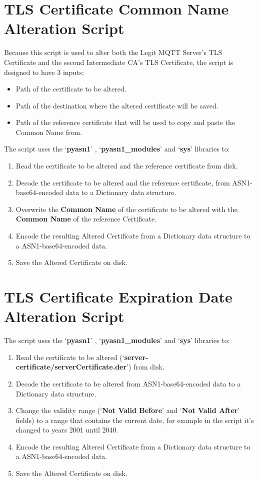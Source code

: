 \documentclass[binding=0.6cm,noexaminfo]{sapthesis}
\begin{document}
\section{TLS Certificate Common Name Alteration Script}

Because this script is used to alter both the Legit MQTT Server's TLS Certificate and the second Intermediate CA's TLS Certificate, the script is designed to have 3 inputs:
\begin{itemize}
	\item Path of the certificate to be altered.
	\item Path of the destination where the altered certificate will be saved.
	\item Path of the reference certificate that will be used to copy and paste the Common Name from.
\end{itemize}
The script uses the `\textbf{pyasn1}' , `\textbf{pyasn1\_modules}' and `\textbf{sys}' libraries to:
\begin{enumerate}
	\item Read the certificate to be altered and the reference certificate from disk.
	\item Decode the certificate to be altered and the reference certificate, from ASN1-base64-encoded data to a Dictionary data structure.
	\item Overwrite the \textbf{Common Name} of the certificate to be altered with the \textbf{Common Name} of the reference Certificate.
	\item Encode the resulting Altered Certificate from a Dictionary data structure to a ASN1-base64-encoded data.
	\item Save the Altered Certificate on disk.
\end{enumerate}

\section{TLS Certificate Expiration Date Alteration Script}

The script uses the `\textbf{pyasn1}' , `\textbf{pyasn1\_modules}' and `\textbf{sys}' libraries to:
\begin{enumerate}
	\item Read the certificate to be altered (`\textbf{server-certificate/serverCertificate.der}') from disk.
	\item Decode the certificate to be altered from ASN1-base64-encoded data to a Dictionary data structure.
	\item Change the validity range (`\textbf{Not Valid Before}' and `\textbf{Not Valid After}' fields) to a range that contains the current date, for example in the script it's changed to years 2001 until 2040.
	\item Encode the resulting Altered Certificate from a Dictionary data structure to a ASN1-base64-encoded data.
	\item Save the Altered Certificate on disk.
\end{enumerate}
\end{document}
